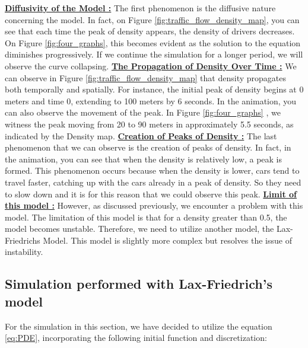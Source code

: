 \documentclass{article}
\begin{document}
	\newline\newline\textbf{\underline{Diffusivity of the Model :}} The first phenomenon is the diffusive nature concerning the model. In fact, on Figure \ref{fig:traffic_flow_density_map}, you can see that each time the peak of density appears, the density of drivers decreases. On Figure \ref{fig:four_graphs}, this becomes evident as the solution to the equation diminishes progressively. If we continue the simulation for a longer period, we will observe the curve collapsing.
	\newline\newline
	\textbf{\underline{The Propagation of Density Over Time :}} We can observe in Figure \ref{fig:traffic_flow_density_map} that density propagates both temporally and spatially. For instance, the initial peak of density begins at 0 meters and time 0, extending to 100 meters by 6 seconds. In the animation, you can also observe the movement of the peak. In Figure \ref{fig:four_graphs} , we witness the peak moving from 20 to 90 meters in approximately 5.5 seconds, as indicated by the Density map.
	\newline\newline
	\textbf{\underline{Creation of Peaks of Density :}}
	The last phenomenon that we can observe is the creation of peaks of density. In fact, in the animation, you can see that when the density is relatively low, a peak is formed. This phenomenon occurs because when the density is lower, cars tend to travel faster, catching up with the cars already in a peak of density. So they need to slow down and it is for this reason that we could observe this peak.
	\newline\newline
	\textbf{\underline{Limit of this model :}}
	However, as discussed previously, we encounter a problem with this model. The limitation of this model is that for a density greater than 0.5, the model becomes unstable. Therefore, we need to utilize another model, the Lax-Friedrichs Model. This model is slightly more complex but resolves the issue of instability. 
	\subsection{Simulation performed with Lax-Friedrich's model}
	
	For the simulation in this section, we have decided to utilize the equation \ref{eq:PDE}, incorporating the following initial function and discretization:
	
\end{document}
